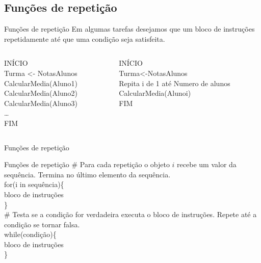 \documentclass[handout]{beamer}
\begin{document}
\subsection{Funções de repetição}
\begin{frame}{Funções de repetição}
Em algumas tarefas desejamos que um bloco de instruções repetidamente até que uma condição seja satisfeita.
   \begin{columns}
     \begin{column}{6cm}
       INÍCIO\\
    Turma <- NotasAlunos\\
      CalcularMedia(Aluno1)\\
      CalcularMedia(Aluno2)\\
      CalcularMedia(Aluno3)\\
      \dots\\
      FIM\\
     \end{column}
     \begin{column}{6cm}
      INÍCIO\\
      Turma<-NotasAlunos\\
      Repita i de 1 até Numero de alunos\\
      \hspace{10pt} CalcularMedia(Alunoi)\\
       FIM     \\
    \end{column}
  \end{columns}
\end{frame}

\begin{frame}{Funções de repetição}
  \begin{block}{Funções de repetição}
    \# Para cada repetição o objeto $i$ recebe um valor da sequência. Termina no último elemento da sequência.\\
for(i in sequência)\{\\
bloco de instruções \\
\}\\ \vspace{10pt}
 \# Testa se a condição for verdadeira executa o bloco de instruções. Repete até a condição se tornar falsa.\\
 while(condição)\{\\
 bloco de instruções\\
 \}
  \end{block}
\end{frame}
\end{document}
